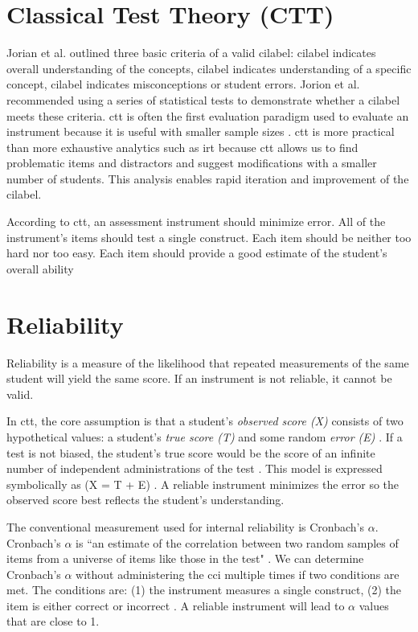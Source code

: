 \section{Classical Test Theory (CTT)}


Jorian et al. \cite{jorian} outlined three basic criteria of a valid \gls{cilabel}: \gls{cilabel} indicates overall understanding of the concepts, \gls{cilabel} indicates understanding of a specific concept, \gls{cilabel} indicates misconceptions or student errors. Jorion et al. recommended using a series of statistical tests to demonstrate whether a \gls{cilabel} meets these criteria. \gls{ctt} is often the first evaluation paradigm used to evaluate an instrument because it is useful with smaller sample sizes \cite{og_ctt}. \gls{ctt} is more practical than more exhaustive analytics such as \gls{irt} because \gls{ctt} allows us to find problematic items and distractors and suggest modifications with a smaller number of students. This analysis enables rapid iteration and improvement of the \gls{cilabel}.     
     
     
According to \gls{ctt}, an assessment instrument should minimize error. All of the instrument's items should test a single construct. Each item should be neither too hard nor too easy. Each item should provide a good estimate of the student's overall ability

\section{Reliability}

Reliability is a measure of the likelihood that repeated measurements of the same student will yield the same score. If an instrument is not reliable, it cannot be valid.     
 
In \gls{ctt}, the core assumption is that a student's \textit{observed score (X)} consists of two hypothetical values: a student's \textit{true score (T)} and some random \textit{error (E)} \cite{og_ctt}. If a test is not biased, the student's true score would be the score of an infinite number of independent administrations of the test \cite{true_score}.  This model is expressed symbolically as (X = T + E) \cite{dlci}. A reliable instrument minimizes the error so the observed score best reflects the student's understanding.      
     
The conventional measurement used for internal reliability is Cronbach's $\alpha$.  Cronbach's $\alpha$ is ``an estimate of the correlation between two random samples of items from a universe of items like those in the test" \cite{og_cronbach}. We can determine Cronbach's $\alpha$  without administering the \gls{cci} multiple times if two conditions are met. The conditions are: (1) the instrument measures a single construct, (2) the item is either correct or incorrect \cite{dlci}. A reliable instrument will lead to $\alpha$ values that are close to 1.       
     
